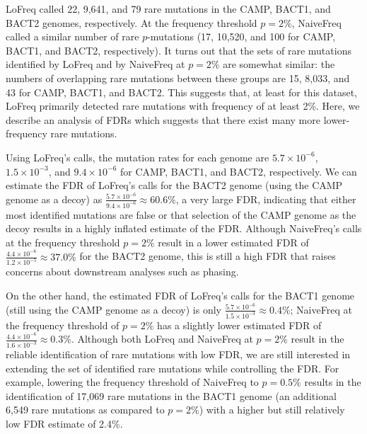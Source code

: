 LoFreq called 22, 9,641, and 79 rare mutations in the CAMP, BACT1, and BACT2 genomes, respectively. At the frequency threshold $p = 2\%$, NaiveFreq called a similar number of rare $p$-mutations (17, 10,520, and 100 for CAMP, BACT1, and BACT2, respectively). It turns out that the sets of rare mutations identified by LoFreq and by NaiveFreq at $p = 2\%$ are somewhat similar: the numbers of overlapping rare mutations between these groups are 15, 8,033, and 43 for CAMP, BACT1, and BACT2. This suggests that, at least for this dataset, LoFreq primarily detected rare mutations with frequency of at least 2\%. Here, we describe an analysis of FDRs which suggests that there exist many more lower-frequency rare mutations.

Using LoFreq's calls, the mutation rates for each genome are $5.7 \times 10^{-6}$, $1.5 \times 10^{-3}$, and $9.4 \times 10^{-6}$ for CAMP, BACT1, and BACT2, respectively. We can estimate the FDR of LoFreq's calls for the BACT2 genome (using the CAMP genome as a decoy) as $\frac{5.7 \times 10^{-6}}{9.4 \times 10^{-6}} \approx 60.6\%$, a very large FDR, indicating that either most identified mutations are false or that selection of the CAMP genome as the decoy results in a highly inflated estimate of the FDR. Although NaiveFreq's calls at the frequency threshold $p = 2\%$ result in a lower estimated FDR of $\frac{4.4 \times 10^{-6}}{1.2 \times 10^{-5}} \approx 37.0\%$ for the BACT2 genome, this is still a high FDR that raises concerns about downstream analyses such as phasing.

On the other hand, the estimated FDR of LoFreq's calls for the BACT1 genome (still using the CAMP genome as a decoy) is only $\frac{5.7 \times 10^{-6}}{1.5 \times 10^{-3}} \approx 0.4\%$; NaiveFreq at the frequency threshold of $p = 2\%$ has a slightly lower estimated FDR of $\frac{4.4 \times 10^{-6}}{1.6 \times 10^{-3}} \approx 0.3\%$. Although both LoFreq and NaiveFreq at $p = 2\%$ result in the reliable identification of rare mutations with low FDR, we are still interested in extending the set of identified rare mutations while controlling the FDR. For example, lowering the frequency threshold of NaiveFreq to $p = 0.5\%$ results in the identification of 17,069 rare mutations in the BACT1 genome (an additional 6,549 rare mutations as compared to $p = 2\%$) with a higher but still relatively low FDR estimate of 2.4\%.\endinput